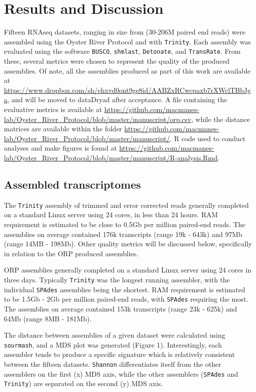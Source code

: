 \documentclass[10pt,letterpaper]{article}
\begin{document}
\section{Results and Discussion}

Fifteen RNAseq datasets, ranging in size from (30-206M paired end reads) were assembled using the Oyster River Protocol and with \texttt{Trinity}. Each assembly was evaluated using the software \texttt{BUSCO}, \texttt{shmlast}, \texttt{Detonate}, and \texttt{TransRate}. From these, several metrics were chosen to represent the quality of the produced assemblies. Of note, all the assemblies produced as part of this work are available at \url{https://www.dropbox.com/sh/ehxvd0ont9ge8id/AABZxRCwcpaxb7rXWclTBbJga}, and will be moved to dataDryad after acceptance. A file containing the evaluative metrics is available at \url{https://github.com/macmanes-lab/Oyster_River_Protocol/blob/master/manuscript/orp.csv}, while the distance matrices are available within the folder \url{https://github.com/macmanes-lab/Oyster_River_Protocol/blob/master/manuscript/}. R code used to conduct analyses and make figures is found at \url{https://github.com/macmanes-lab/Oyster_River_Protocol/blob/master/manuscript/R-analysis.Rmd}. 

\subsection{Assembled transcriptomes} 

The \texttt{Trinity} assembly of trimmed and error corrected reads generally completed on a standard Linux server using 24 cores, in less than 24 hours. RAM requirement is estimated to be close to 0.5Gb per million paired-end reads. The assemblies on average contained 176k transcripts (range 19k - 643k) and 97Mb (range 14MB - 198Mb). Other quality metrics will be discussed below, specifically in relation to the ORP produced assemblies.  

ORP assemblies generally completed on a standard Linux server using 24 cores in three days. Typically \texttt{Trinity} was the longest running assembler, with the individual \texttt{SPAdes} assemblies being the shortest. RAM requirement is estimated to be 1.5Gb - 2Gb per million paired-end reads, with \texttt{SPAdes} requiring the most. The assemblies on average contained 153k transcripts (range 23k - 625k) and 64Mb (range 8MB - 181Mb).

The distance between assemblies of a given dataset were calculated using \texttt{sourmash}, and a MDS plot was generated (Figure 1). Interestingly, each assembler tends to produce a specific signature which is relatively consistent between the fifteen datasets. \texttt{Shannon} differentiates itself from the other assemblers on the first (x) MDS axis, while the other assemblers (\texttt{SPAdes} and \texttt{Trinity}) are separated on the second (y) MDS axis. 
\end{document}
